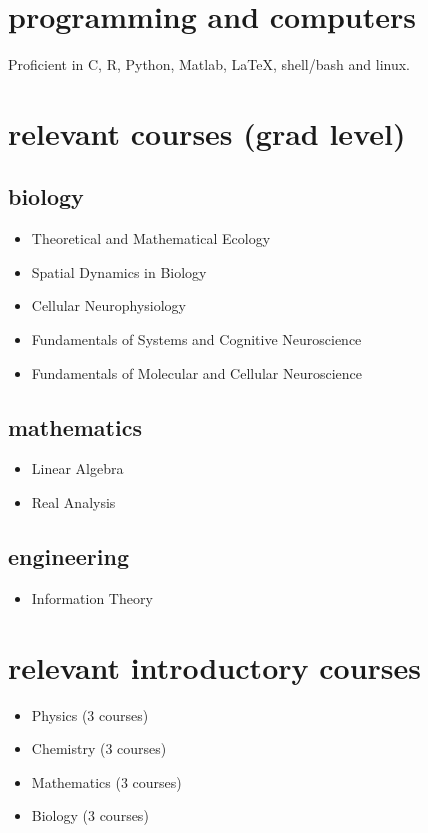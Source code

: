\documentclass[11pt]{friggeri-cv}
\begin{document}
\section{programming and computers}
Proficient in C, R, Python,
    Matlab,
    \LaTeX,
    shell/bash and
    linux.


\pagebreak

\begin{multicols}{2}[]

\begin{minipage}{1.05\columnwidth}
\section{relevant courses (grad level)}


\subsection{biology}

\begin{itemize}
\item Theoretical and Mathematical Ecology
\item Spatial Dynamics in Biology
\item Cellular Neurophysiology
\item Fundamentals of Systems and Cognitive Neuroscience
\item Fundamentals of Molecular and Cellular Neuroscience
\end{itemize}


\subsection{mathematics}
\begin{itemize}
\item Linear Algebra
\item Real Analysis
\end{itemize}

\subsection{engineering}
\begin{itemize}
\item Information Theory
\end{itemize}
\vspace{1em}
\section{ relevant introductory courses }
\begin{itemize}
\item Physics (3 courses)
\item Chemistry (3 courses)
\item Mathematics (3 courses)
\item Biology (3 courses)
\end{itemize}




\end{minipage}
\end{multicols}
\end{document}
